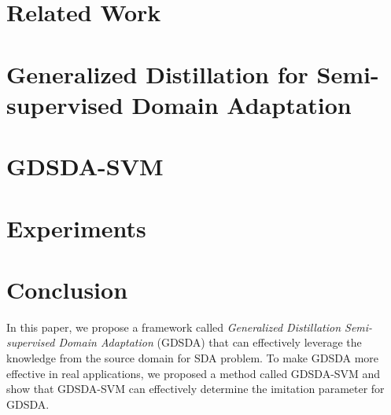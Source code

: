 \documentclass[letterpaper]{article}
\begin{document}
\section{Related Work}\label{sec:work}


\section{Generalized Distillation for Semi-supervised Domain Adaptation}\label{sec:gdda}



\section{GDSDA-SVM}\label{sec:svm}


\section{Experiments}\label{sec:exp}


\section{Conclusion}\label{sec:con}
In this paper, we propose a framework called \textit{Generalized Distillation Semi-supervised Domain Adaptation} (GDSDA) that can effectively leverage the knowledge from the source domain for SDA problem. To make GDSDA more effective in real applications, we proposed a method called GDSDA-SVM and show that GDSDA-SVM can effectively determine the imitation parameter for GDSDA.


\end{document}
